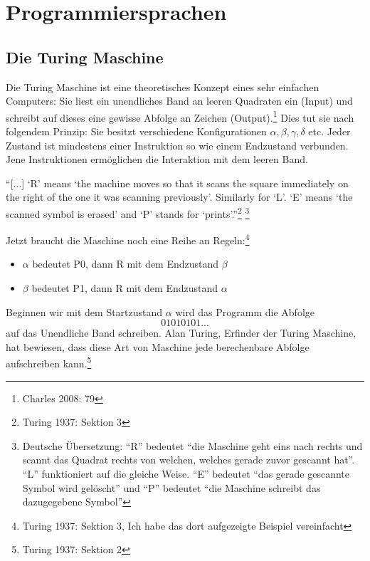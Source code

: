 \documentclass[a4paper,10pt]{article}
\begin{document}
\section{Programmiersprachen}
\subsection{Die Turing Maschine}
Die Turing Maschine ist eine theoretisches Konzept eines sehr einfachen Computers: Sie liest ein unendliches Band an leeren Quadraten ein (Input) und schreibt auf dieses eine gewisse Abfolge an Zeichen (Output).\footnote{Charles 2008: 79} Dies tut sie nach folgendem Prinzip: Sie besitzt verschiedene Konfigurationen $\alpha, \beta, \gamma, \delta$ etc. Jeder Zustand ist mindestens einer Instruktion so wie einem Endzustand verbunden. Jene Instruktionen ermöglichen die Interaktion mit dem leeren Band. 
\begin{displayquote}
\enquote{[...] \enquote{R} means \enquote{the machine moves
so that it scans the square immediately on the right of the one it was
scanning previously}. Similarly for \enquote{L}. \enquote{E} means \enquote{the scanned
symbol is erased} and \enquote{P} stands for \enquote{prints}.}\footnote{Turing 1937: Sektion 3} \footnote{Deutsche Übersetzung: \enquote{R} bedeutet \enquote{die Maschine geht eins nach rechts und scannt das Quadrat rechts von welchen, welches gerade zuvor gescannt hat}. \enquote{L} funktioniert auf die gleiche Weise. \enquote{E} bedeutet \enquote{das gerade gescannte Symbol wird gelöscht} und \enquote{P} bedeutet \enquote{die Maschine schreibt das dazugegebene Symbol}}
\end{displayquote}
Jetzt braucht die Maschine noch eine Reihe an Regeln:\footnote{Turing 1937: Sektion 3, Ich habe das dort aufgezeigte Beispiel vereinfacht}
\begin{itemize}
    \item $\alpha$ bedeutet P0, dann R mit dem Endzustand $\beta$
    \item $\beta$ bedeutet P1, dann R mit dem Endzustand $\alpha$
\end{itemize}
Beginnen wir mit dem Startzustand $\alpha$ wird das Programm die Abfolge $$01010101...$$ auf das Unendliche Band schreiben. Alan Turing, Erfinder der Turing Maschine, hat bewiesen, dass diese Art von Maschine jede berechenbare Abfolge aufschreiben kann.\footnote{Turing 1937: Sektion 2}
\end{document}
